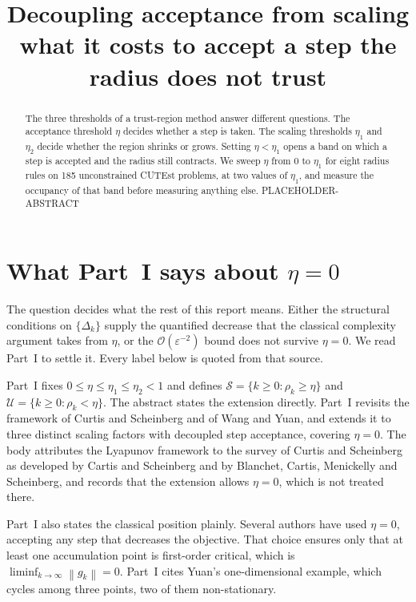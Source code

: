 \documentclass[11pt,a4paper]{article}
\title{Decoupling acceptance from scaling\\
       {\large what it costs to accept a step the radius does not trust}}
\author{}
\date{}
\providecommand{\calO}{{\mathcal{O}}}
\providecommand{\calS}{{\mathcal{S}}}
\providecommand{\calU}{{\mathcal{U}}}
\providecommand{\norm}[1]{\left \lVert #1 \right \rVert}
\begin{document}
\maketitle

\begin{abstract}
The three thresholds of a trust-region method answer different questions. The
acceptance threshold $\eta$ decides whether a step is taken. The scaling
thresholds $\eta_1$ and $\eta_2$ decide whether the region shrinks or grows.
Setting $\eta < \eta_1$ opens a band on which a step is accepted and the radius
still contracts. We sweep $\eta$ from $0$ to $\eta_1$ for eight radius rules on
185 unconstrained CUTEst problems, at two values of $\eta_1$, and measure the
occupancy of that band before measuring anything else. PLACEHOLDER-ABSTRACT
\end{abstract}

\section{What Part~I says about \texorpdfstring{$\eta = 0$}{eta = 0}}
\label{sec: part I}

The question decides what the rest of this report means. Either the structural
conditions on $\{\Delta_k\}$ supply the quantified decrease that the classical
complexity argument takes from $\eta$, or the $\calO(\varepsilon^{-2})$ bound
does not survive $\eta = 0$. We read Part~I to settle it. Every label below is
quoted from that source.

Part~I fixes $0 \leq \eta \leq \eta_1 \leq \eta_2 < 1$ and defines
$\calS = \{k \geq 0 : \rho_k \geq \eta\}$ and
$\calU = \{k \geq 0 : \rho_k < \eta\}$. The abstract states the extension
directly. Part~I revisits the framework of Curtis and Scheinberg and of Wang and
Yuan, and extends it to three distinct scaling factors with decoupled step
acceptance, covering $\eta = 0$. The body attributes the Lyapunov framework to
the survey of Curtis and Scheinberg as developed by Cartis and Scheinberg and by
Blanchet, Cartis, Menickelly and Scheinberg, and records that the extension
allows $\eta = 0$, which is not treated there.

Part~I also states the classical position plainly. Several authors have used
$\eta = 0$, accepting any step that decreases the objective. That choice ensures
only that at least one accumulation point is first-order critical, which is
$\liminf_{k \to \infty}\norm{g_k} = 0$. Part~I cites Yuan's one-dimensional
example, which cycles among three points, two of them non-stationary.
\end{document}
